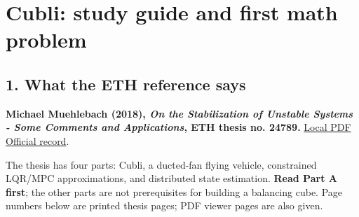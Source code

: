 \documentclass[
]{article}
\author{}
\date{}
\begin{document}
\section{Cubli: study guide and first math
problem}\label{cubli-study-guide-and-first-math-problem}

\subsection{1. What the ETH reference
says}\label{what-the-eth-reference-says}

\textbf{Michael Muehlebach (2018), \emph{On the Stabilization of
Unstable Systems - Some Comments and Applications}, ETH thesis no.
24789.} \href{phdthesisE-Collection.pdf}{Local PDF} \textbar{}
\href{https://doi.org/10.3929/ethz-b-000254022}{Official record}.

The thesis has four parts: Cubli, a ducted-fan flying vehicle,
constrained LQR/MPC approximations, and distributed state estimation.
\textbf{Read Part A first}; the other parts are not prerequisites for
building a balancing cube. Page numbers below are printed thesis pages;
PDF viewer pages are also given.
\end{document}
